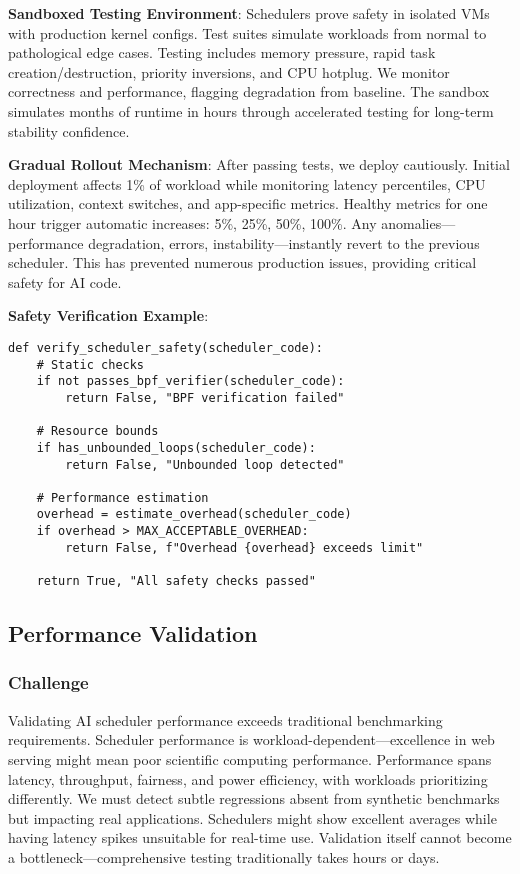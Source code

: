\textbf{Sandboxed Testing Environment}: Schedulers prove safety in isolated VMs with production kernel configs. Test suites simulate workloads from normal to pathological edge cases. Testing includes memory pressure, rapid task creation/destruction, priority inversions, and CPU hotplug. We monitor correctness and performance, flagging degradation from baseline. The sandbox simulates months of runtime in hours through accelerated testing for long-term stability confidence.

\textbf{Gradual Rollout Mechanism}: After passing tests, we deploy cautiously. Initial deployment affects 1\% of workload while monitoring latency percentiles, CPU utilization, context switches, and app-specific metrics. Healthy metrics for one hour trigger automatic increases: 5\%, 25\%, 50\%, 100\%. Any anomalies—performance degradation, errors, instability—instantly revert to the previous scheduler. This has prevented numerous production issues, providing critical safety for AI code.

\textbf{Safety Verification Example}:
\begin{verbatim}
def verify_scheduler_safety(scheduler_code):
    # Static checks
    if not passes_bpf_verifier(scheduler_code):
        return False, "BPF verification failed"
    
    # Resource bounds
    if has_unbounded_loops(scheduler_code):
        return False, "Unbounded loop detected"
    
    # Performance estimation
    overhead = estimate_overhead(scheduler_code)
    if overhead > MAX_ACCEPTABLE_OVERHEAD:
        return False, f"Overhead {overhead} exceeds limit"
    
    return True, "All safety checks passed"
\end{verbatim}

\subsection{Performance Validation}

\subsubsection{Challenge}
Validating AI scheduler performance exceeds traditional benchmarking requirements. Scheduler performance is workload-dependent—excellence in web serving might mean poor scientific computing performance. Performance spans latency, throughput, fairness, and power efficiency, with workloads prioritizing differently. We must detect subtle regressions absent from synthetic benchmarks but impacting real applications. Schedulers might show excellent averages while having latency spikes unsuitable for real-time use. Validation itself cannot become a bottleneck—comprehensive testing traditionally takes hours or days.

